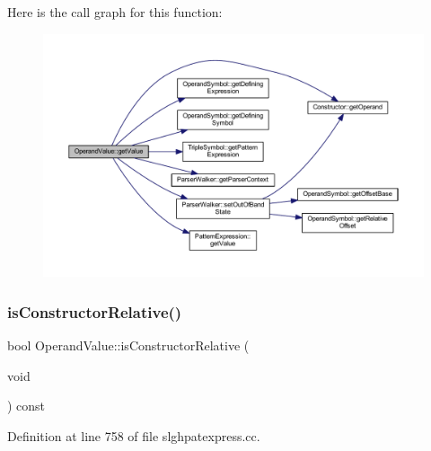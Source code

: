 Here is the call graph for this function\+:
\nopagebreak
\begin{figure}[H]
\begin{center}
\leavevmode
\includegraphics[width=350pt]{class_operand_value_a5e43ba8332983fb0268dac1ce7903f19_cgraph}
\end{center}
\end{figure}
\mbox{\label{class_operand_value_ac5edba5396509e93a2c4b9940189f8e2}} 
\subsubsection{\texorpdfstring{isConstructorRelative()}{isConstructorRelative()}}
{\footnotesize\ttfamily bool Operand\+Value\+::is\+Constructor\+Relative (\begin{DoxyParamCaption}\item[{void}]{ }\end{DoxyParamCaption}) const}



Definition at line 758 of file slghpatexpress.\+cc.

